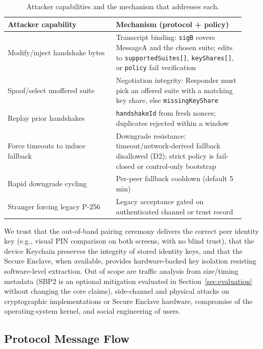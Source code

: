 \documentclass[10pt,journal,compsoc]{IEEEtran}
\newcommand{\nbcode}[1]{\mbox{\texttt{#1}}}
\begin{document}
\begin{table}[!t]
\centering
\scriptsize
\caption{Attacker capabilities and the mechanism that addresses each.}
\label{tab:threat-defense-mapping}
\begingroup
\setlength{\tabcolsep}{3pt}
\begin{tabular}{@{}p{0.42\linewidth}p{0.50\linewidth}@{}}
\toprule
Attacker capability & Mechanism (protocol + policy) \\
\midrule
Modify/inject handshake bytes & Transcript binding: \texttt{sigB} covers MessageA and the chosen suite; edits to \nbcode{supportedSuites[]}, \nbcode{keyShares[]}, or \texttt{policy} fail verification \\
Spoof/select unoffered suite & Negotiation integrity: Responder must pick an offered suite with a matching key share, else \texttt{missingKeyShare} \\
Replay prior handshakes & \texttt{handshakeId} from fresh nonces; duplicates rejected within a window \\
Force timeouts to induce fallback & Downgrade resistance: timeout/network-derived fallback disallowed (D2); strict policy is fail-closed or control-only bootstrap \\
Rapid downgrade cycling & Per-peer fallback cooldown (default 5\,min) \\
Stranger forcing legacy P-256 & Legacy acceptance gated on authenticated channel or trust record \\
\bottomrule
\end{tabular}
\endgroup
\end{table}

We trust that the out-of-band pairing ceremony delivers the correct peer
identity key (e.g., visual PIN comparison on both screens, with no blind
trust), that the device Keychain preserves the integrity of stored
identity keys, and that the Secure Enclave, when available, provides
hardware-backed key isolation resisting software-level extraction.
Out of scope are traffic analysis from size/timing metadata (SBP2 is an
optional mitigation evaluated in Section~\ref{sec:evaluation} without
changing the core claims), side-channel and physical attacks on
cryptographic implementations or Secure Enclave hardware, compromise of
the operating-system kernel, and social engineering of users.

\subsection{Protocol Message
Flow}\label{a.2-protocol-message-flow}
\end{document}
